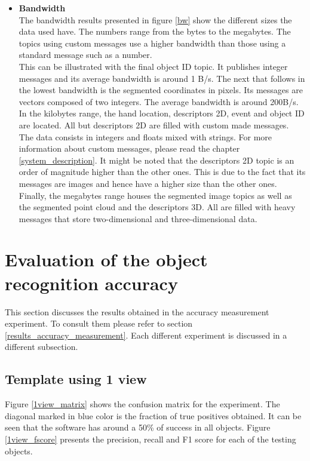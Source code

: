 \begin{itemize}
			\\

			\item{\textbf{Bandwidth}}\\

			The  bandwidth results presented in figure \ref{bw} show the different sizes the data used have. 
			The numbers range from the bytes to the megabytes. 
			The topics using custom messages use a higher bandwidth than those using a standard message such as a number. 
			\\

			This can be illustrated with the final object ID topic. 
			It publishes integer messages and its average bandwidth is around 1 B/s. 
			The next that follows in the lowest bandwidth is the segmented coordinates in pixels. 
			Its messages are vectors composed of two integers. 
			The average bandwidth is around 200B/s. 
			\\

			In the kilobytes range, the hand location, descriptors 2D, event and object ID are located. 
			All but descriptors 2D are filled with custom made messages. 
			The data consists in integers and floats mixed with strings. 
			For more information about custom messages, please read the chapter \ref{system_description}.
			It might be noted that the descriptors 2D topic is an order of magnitude higher than the other ones. 
			This is due to the fact that its messages are images and hence have a higher size than the other ones. 
			\\

			Finally, the megabytes range houses the segmented image topics as well as the segmented point cloud and the descriptors 3D. 
			All are filled with heavy messages that store two-dimensional and three-dimensional data. 
		\end{itemize}

\section{Evaluation of the object recognition accuracy}
	This section discusses the results obtained in the accuracy measurement experiment. 
	To consult them please refer to section \ref{results_accuracy_measurement}.
	Each different experiment is discussed in a different subsection.


	\subsection{Template using 1 view}
	Figure \ref{1view_matrix} shows the confusion matrix for the experiment. 
	The diagonal marked in blue color is the fraction of true positives obtained. 
	It can be seen that the software has around a 50\% of success in all objects. 
	Figure \ref{1view_fscore} presents the precision, recall and F1 score for each of the testing objects. 
	\\

